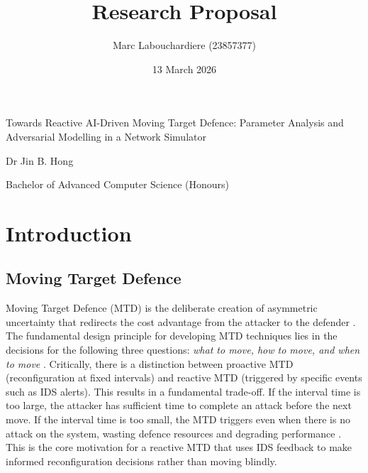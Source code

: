 \documentclass[11pt, a4paper]{article}
\title{Research Proposal}
\author{Marc Labouchardiere (23857377)}
\date{13 March 2026}
\newcommand{\namelistlabel}[1]{\mbox{#1}\hfil}
\newenvironment{namelist}[1]{%
\begin{list}{}
    {
        \let\makelabel\namelistlabel
        \settowidth{\labelwidth}{#1}
        \setlength{\leftmargin}{1.1\labelwidth}
    }
  }{%
\end{list}}
\begin{document}
\thispagestyle{empty}
\newpage
\setcounter{page}{1}
\maketitle

\begin{namelist}{xxxxxxxxxxxx}
\item[{\bf Title:}]
	Towards Reactive AI-Driven Moving Target Defence: Parameter Analysis and Adversarial Modelling in a Network Simulator
\item[{\bf Supervisor:}]
	Dr Jin B. Hong
\item[{\bf Degree:}]
	Bachelor of Advanced Computer Science (Honours)
\end{namelist}

\section{Introduction} 

\subsection{Moving Target Defence}

Moving Target Defence (MTD) is the deliberate creation of asymmetric uncertainty that redirects the cost advantage from the attacker to the defender \cite{jajodia2011}. The fundamental design principle for developing MTD techniques lies in the decisions for the following three questions: \textit{what to move, how to move, and when to move} \cite{cai2016}. Critically, there is a distinction between proactive MTD (reconfiguration at fixed intervals) and reactive MTD (triggered by specific events such as IDS alerts). This results in a fundamental trade-off. If the interval time is too large, the attacker has sufficient time to complete an attack before the next move. If the interval time is too small, the MTD triggers even when there is no attack on the system, wasting defence resources and degrading performance \cite{sengupta2020}. This is the core motivation for a reactive MTD that uses IDS feedback to make informed reconfiguration decisions rather than moving blindly.
\end{document}
